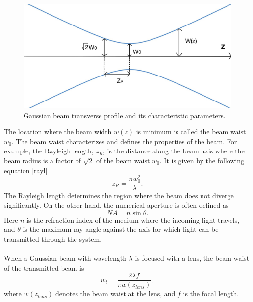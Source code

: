 \documentclass[letterpaper,12pt,oneside]{book}
\begin{document}
\begin{figure}[H]
    \centering
    \includegraphics[scale=0.11]{Gaussian -2.jpeg}
    \caption{Gaussian beam transverse profile and its characteristic parameters.}
    \label{Gaussian beam transversal profile}
\end{figure}
\noindent
The location where the beam width $w(z)$ is minimum is called the beam waist $w_0$. The beam waist characterizes and defines the properties of the beam. For example, the Rayleigh length, $z_R$, is the distance along the beam axis where the beam radius is a factor of $\sqrt{2}$ of the beam waist $w_0$. It is given by the following equation \eqref{rayl}
\begin{equation}
    z_R=\frac{\pi w^2_0}{\lambda}.
    \label{rayl}
\end{equation}
The Rayleigh length determines the region where the beam does not diverge significantly. \newline
\noindent
On the other hand, the numerical aperture is often defined as 
\begin{equation}
    NA=n \sin{\theta}.
\end{equation}
Here $n$ is the refraction index of the medium where the incoming light travels, and $\theta$ is the maximum ray angle against the axis for which light can be transmitted through the system. \\\\
\noindent
When a Gaussian beam with wavelength $\lambda$ is focused with a lens, the beam waist of the transmitted beam is \cite{svelto2010principles}
\begin{equation}
    w_t=\frac{2\lambda f}{\pi w(z_{lens})},
\end{equation}
where $w(z_{lens})$ denotes the beam waist at the lens, and $f$ is the focal length.




\end{document}
